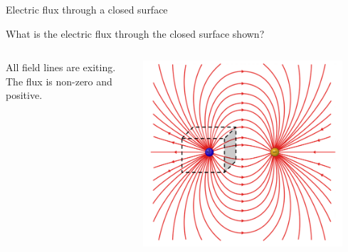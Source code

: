 %
%
%

\begin{frame}{Electric flux through a closed surface}

\begin{center}
 What is the electric flux through the closed surface shown?\\
\end{center}
\vspace{0.2cm}

\begin{columns}
  \begin{column}{0.38\textwidth}
   {\small
     All field lines are exiting.
     The flux is non-zero and positive.
   }
   \begin{center}
   \end{center}
  \end{column}
  \begin{column}{0.62\textwidth}
    \includegraphics[width=0.90\textwidth]{./images/schematics/electric_dipole_field_lines_closed_surf_posq.png}
  \end{column}
\end{columns}
\end{frame}


%
%
%

